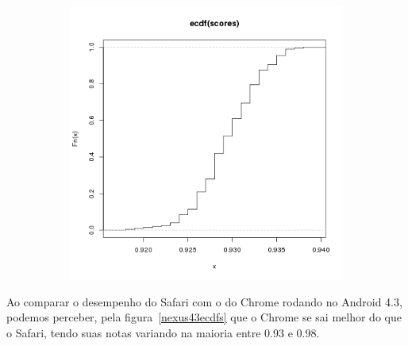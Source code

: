 \documentclass[11pt,a4paper]{article}
\begin{document}
\begin{figure}
\begin{subfigure}{.5\textwidth}
        \includegraphics[width=\textwidth]{images/ecdf-ipad-3-ios7-safari-200-amostras-20131126}
        \label{safari200}
    \end{subfigure}
\end{figure}

Ao comparar o desempenho do Safari com o do Chrome rodando no Android 4.3, podemos perceber, pela
figura~\ref{nexus43ecdfs} que o Chrome se sai melhor do que o Safari, tendo suas notas variando na maioria entre 0.93 e
0.98.
\end{document}
